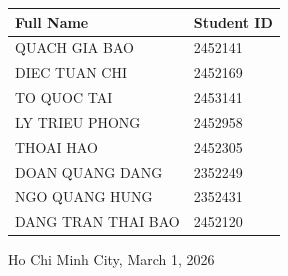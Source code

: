 \documentclass[12pt]{article}
\begin{document}
\begin{titlepage}
\begin{table}[h!]
  \centering
  \begin{tabular}{ll}
    \hline
    \textbf{Full Name} & \textbf{Student ID} \\
    \hline
    QUACH GIA BAO      & 2452141 \\
    DIEC TUAN CHI     & 2452169 \\
    TO QUOC TAI   & 2453141\\
    LY TRIEU PHONG & 2452958\\
    THOAI HAO & 2452305\\
    DOAN QUANG DANG & 2352249\\
    NGO QUANG HUNG & 2352431\\
    DANG TRAN THAI BAO & 2452120\\
    \hline
  \end{tabular}
  \label{tab:students}
\end{table}
  {\footnotesize Ho Chi Minh City, March 1, 2026}
\end{titlepage}


\newpage

\newpage
\tableofcontents

\newpage





\newpage
\end{document}
